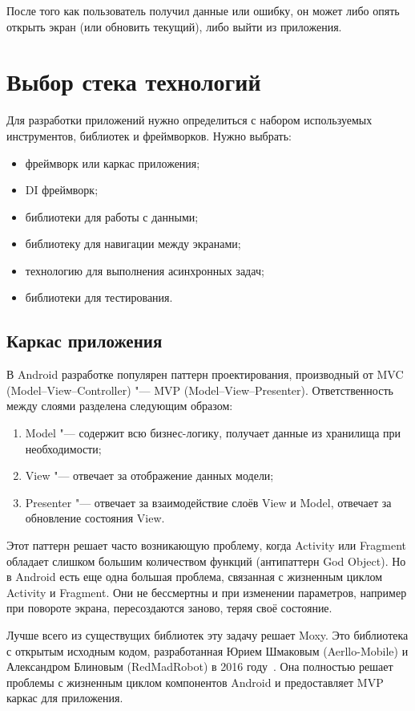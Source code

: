 После того как пользователь получил данные или ошибку, он может либо опять открыть экран (или обновить текущий), либо выйти из приложения.

\section{Выбор стека технологий}
\label{sec:stack}
Для разработки приложений нужно определиться с набором используемых инструментов, библиотек и фреймворков.
Нужно выбрать:
\begin{itemize}
  \item фреймворк или каркас приложения;
  \item DI фреймворк;
  \item библиотеки для работы с данными;
  \item библиотеку для навигации между экранами;
  \item технологию для выполнения асинхронных задач;
  \item библиотеки для тестирования.
\end{itemize}

\subsection{Каркас приложения}
\label{subsec:mvp}
В Android разработке популярен паттерн проектирования, производный от MVC (Model--View--Controller) "--- MVP (Model--View--Presenter).
Ответственность между слоями разделена следующим образом:
\begin{enumerate}
  \item Model "--- содержит всю бизнес-логику, получает данные из хранилища при необходимости;
  \item View "--- отвечает за отображение данных модели;
  \item Presenter "--- отвечает за взаимодействие слоёв View и Model, отвечает за обновление состояния View.
\end{enumerate}

Этот паттерн решает часто возникающую проблему, когда Activity или Fragment обладает слишком большим количеством функций (антипаттерн God Object).
Но в Android есть еще одна большая проблема, связанная с жизненным циклом Activity и Fragment.
Они не бессмертны и при изменении параметров, например при повороте экрана, пересоздаются заново, теряя своё состояние.

Лучше всего из существущих библиотек эту задачу решает Moxy.
Это библиотека с открытым исходным кодом, разработанная Юрием Шмаковым (Aerllo-Mobile) и Александром Блиновым (RedMadRobot) в 2016 году~\cite{github:moxy}.
Она полностью решает проблемы с жизненным циклом компонентов Android и предоставляет MVP каркас для приложения.

